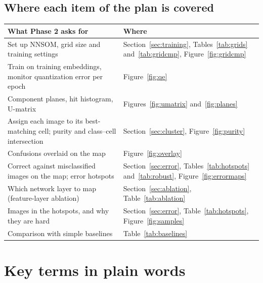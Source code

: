 \documentclass[11pt]{article}
\begin{document}
\subsection*{Where each item of the plan is covered}

{\small
\renewcommand{\arraystretch}{1.12}
\begin{tabularx}{\textwidth}{|>{\raggedright\arraybackslash}p{}|X|}
\hline
\textbf{What Phase 2 asks for} & \textbf{Where} \\ \hline
Set up NNSOM, grid size and training settings & Section~\ref{sec:training}, Tables~\ref{tab:grids} and~\ref{tab:gridcmp}, Figure~\ref{fig:gridcmp} \\ \hline
Train on training embeddings, monitor quantization error per epoch & Figure~\ref{fig:qe} \\ \hline
Component planes, hit histogram, U-matrix & Figures~\ref{fig:umatrix} and~\ref{fig:planes} \\ \hline
Assign each image to its best-matching cell; purity and class--cell intersection & Section~\ref{sec:cluster}, Figure~\ref{fig:purity} \\ \hline
Confusions overlaid on the map & Figure~\ref{fig:overlay} \\ \hline
Correct against misclassified images on the map; error hotspots & Section~\ref{sec:error}, Tables~\ref{tab:hotspots} and~\ref{tab:robust}, Figure~\ref{fig:errormaps} \\ \hline
Which network layer to map (feature-layer ablation) & Section~\ref{sec:ablation}, Table~\ref{tab:ablation} \\ \hline
Images in the hotspots, and why they are hard & Section~\ref{sec:error}, Table~\ref{tab:hotspots}, Figure~\ref{fig:samples} \\ \hline
Comparison with simple baselines & Table~\ref{tab:baselines} \\ \hline
\end{tabularx}}

\section{Key terms in plain words}
\end{document}
